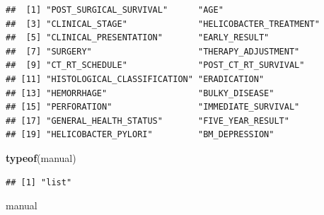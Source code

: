 \documentclass[]{article}
\newenvironment{Shaded}{\begin{snugshade}}{\end{snugshade}}
\newcommand{\KeywordTok}[1]{\textcolor[rgb]{0.13,0.29,0.53}{\textbf{{#1}}}}
\newcommand{\NormalTok}[1]{{#1}}
\begin{document}
\begin{verbatim}
##  [1] "POST_SURGICAL_SURVIVAL"      "AGE"                        
##  [3] "CLINICAL_STAGE"              "HELICOBACTER_TREATMENT"     
##  [5] "CLINICAL_PRESENTATION"       "EARLY_RESULT"               
##  [7] "SURGERY"                     "THERAPY_ADJUSTMENT"         
##  [9] "CT_RT_SCHEDULE"              "POST_CT_RT_SURVIVAL"        
## [11] "HISTOLOGICAL_CLASSIFICATION" "ERADICATION"                
## [13] "HEMORRHAGE"                  "BULKY_DISEASE"              
## [15] "PERFORATION"                 "IMMEDIATE_SURVIVAL"         
## [17] "GENERAL_HEALTH_STATUS"       "FIVE_YEAR_RESULT"           
## [19] "HELICOBACTER_PYLORI"         "BM_DEPRESSION"
\end{verbatim}

\begin{Shaded}
\begin{Highlighting}[]
\KeywordTok{typeof}\NormalTok{(manual)}
\end{Highlighting}
\end{Shaded}

\begin{verbatim}
## [1] "list"
\end{verbatim}

\begin{Shaded}
\begin{Highlighting}[]
\NormalTok{manual}
\end{Highlighting}
\end{Shaded}
\end{document}
